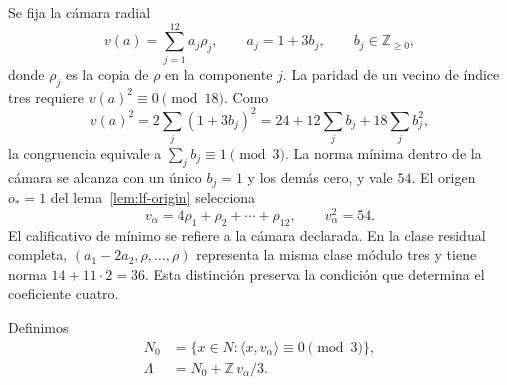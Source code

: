 Se fija la cámara radial
\[
 v(a)=\sum_{j=1}^{12}a_j\rho_j,\qquad
 a_j=1+3b_j,\qquad b_j\in\mathbb Z_{\geq0},
\]
donde \(\rho_j\) es la copia de \(\rho\) en la
componente \(j\). La paridad de un vecino de índice
tres requiere \(v(a)^2\equiv0\pmod{18}\).
Como
\[
 v(a)^2=2\sum_j(1+3b_j)^2
       =24+12\sum_jb_j+18\sum_jb_j^2,
\]
la congruencia equivale a \(\sum_jb_j\equiv1\pmod3\).
La norma mínima dentro de la cámara se alcanza con
un único \(b_j=1\) y los demás cero, y vale \(54\).
El origen \(o_*=1\) del lema~\ref{lem:lf-origin}
selecciona
\begin{equation}
 v_\alpha=4\rho_1+\rho_2+\cdots+\rho_{12},
 \qquad v_\alpha^2=54.
 \label{eq:lf-valpha}
\end{equation}
El calificativo de mínimo se refiere a la cámara
declarada. En la clase residual completa,
\((a_1-2a_2,\rho,\ldots,\rho)\) representa la
misma clase módulo tres y tiene norma
\(14+11\cdot2=36\). Esta distinción preserva
la condición que determina el coeficiente cuatro.

Definimos
\begin{equation}
\begin{split}
 N_0&=\{x\in N:\langle x,v_\alpha\rangle\equiv0\pmod3\},\\
 \Lambda&=N_0+\mathbb Z\,v_\alpha/3.
\end{split}
\label{eq:lf-lambda}
\end{equation}

